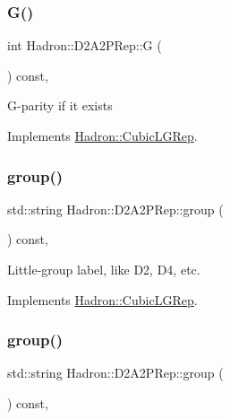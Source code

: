 \subsubsection{\texorpdfstring{G()}{G()}\hspace{0.1cm}{\footnotesize\ttfamily [2/2]}}
{\footnotesize\ttfamily int Hadron\+::\+D2\+A2\+P\+Rep\+::G (\begin{DoxyParamCaption}{ }\end{DoxyParamCaption}) const\hspace{0.3cm}{\ttfamily [inline]}, {\ttfamily [virtual]}}

G-\/parity if it exists 

Implements \mbox{\hyperlink{structHadron_1_1CubicLGRep_ace26f7b2d55e3a668a14cb9026da5231}{Hadron\+::\+Cubic\+L\+G\+Rep}}.

\mbox{\label{structHadron_1_1D2A2PRep_a4268c85ec8e19cbb8d02a4ff1fe784c0}} 
\subsubsection{\texorpdfstring{group()}{group()}\hspace{0.1cm}{\footnotesize\ttfamily [1/2]}}
{\footnotesize\ttfamily std\+::string Hadron\+::\+D2\+A2\+P\+Rep\+::group (\begin{DoxyParamCaption}{ }\end{DoxyParamCaption}) const\hspace{0.3cm}{\ttfamily [inline]}, {\ttfamily [virtual]}}

Little-\/group label, like D2, D4, etc. 

Implements \mbox{\hyperlink{structHadron_1_1CubicLGRep_a9bdb14b519a611d21379ed96a3a9eb41}{Hadron\+::\+Cubic\+L\+G\+Rep}}.

\mbox{\label{structHadron_1_1D2A2PRep_a4268c85ec8e19cbb8d02a4ff1fe784c0}} 
\subsubsection{\texorpdfstring{group()}{group()}\hspace{0.1cm}{\footnotesize\ttfamily [2/2]}}
{\footnotesize\ttfamily std\+::string Hadron\+::\+D2\+A2\+P\+Rep\+::group (\begin{DoxyParamCaption}{ }\end{DoxyParamCaption}) const\hspace{0.3cm}{\ttfamily [inline]}, {\ttfamily [virtual]}}

